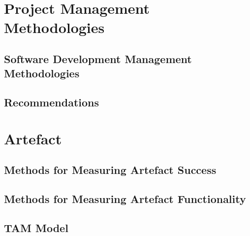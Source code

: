\section{Project Management Methodologies}
\subsection{Software Development Management Methodologies}
\subsection{Recommendations}

\section{Artefact}
\subsection{Methods for Measuring Artefact Success}
\subsection{Methods for Measuring Artefact Functionality}
\subsection{TAM Model}